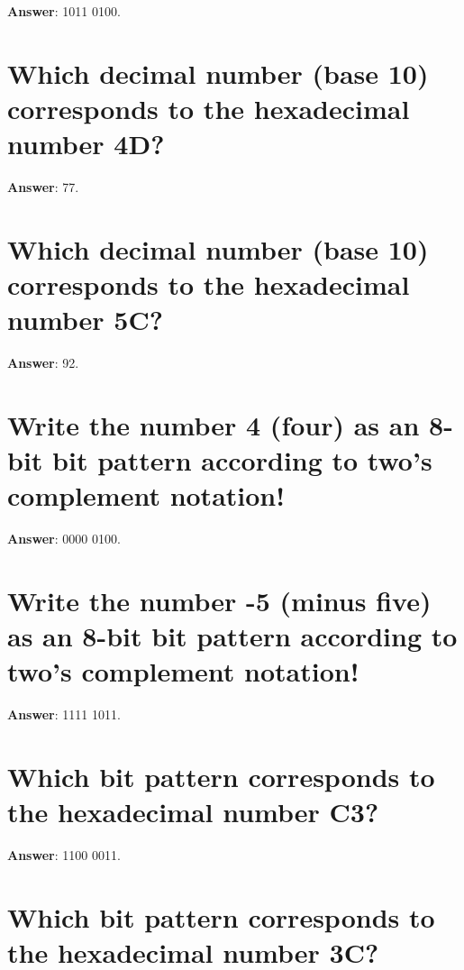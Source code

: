 \documentclass[a4paper,11pt,oneside]{book}
\begin{document}
\begin{sloppypar}
\label{q:383:sa:en:True}

\textbf{Answer}: 1011 0100.



\section{Which decimal number (base 10) corresponds to the hexadecimal number 4D?}

\label{q:384:sa:en:True}

\textbf{Answer}: 77.



\section{Which decimal number (base 10) corresponds to the hexadecimal number 5C?}

\label{q:385:sa:en:True}

\textbf{Answer}: 92.



\section{Write the number 4 (four) as an 8-bit bit pattern according to two's complement notation!}

\label{q:386:sa:en:True}

\textbf{Answer}: 0000 0100.



\section{Write the number -5 (minus five) as an 8-bit bit pattern according to two's complement notation!}

\label{q:387:sa:en:True}

\textbf{Answer}: 1111 1011.



\section{Which bit pattern corresponds to the hexadecimal number C3?}

\label{q:388:sa:en:True}

\textbf{Answer}: 1100 0011.



\section{Which bit pattern corresponds to the hexadecimal number 3C?}


\end{sloppypar}
\end{document}
